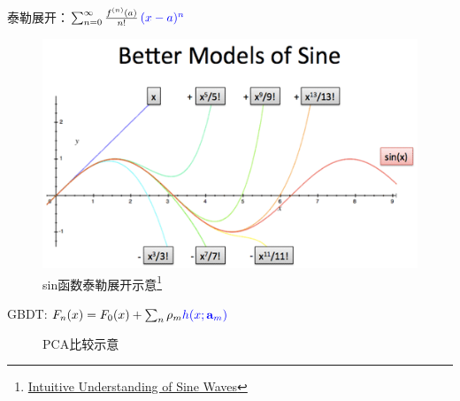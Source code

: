 \begin{frame}
    泰勒展开：$\sum _{n=0}^{\infty }{\frac{f^{(n)}(a)}{n!}}\,\textcolor{blue}{(x-a)^{n}}$

    \begin{figure}[!tb]
        \includegraphics[width=\twopicwidth]{figure/gbdt/sine-better-models}
        \caption{sin函数泰勒展开示意\footnote{
                 \href{https://betterexplained.com/articles/intuitive-understanding-of-sine-waves/}{Intuitive Understanding of Sine Waves}}}
    \end{figure}

    GBDT: $F_n(x) = F_{0}(x) + \sum_n \rho_m \textcolor{blue}{h(x; \mathbf{a}_m)}$
\end{frame}


\begin{frame}
    \begin{figure}
        \centering
        \hfil
        \subfigure[][]{
            \resizebox{0.50\linewidth}{!}{}
        }
        \caption{PCA\footnotemark 比较示意}
    \end{figure}

\end{frame}


